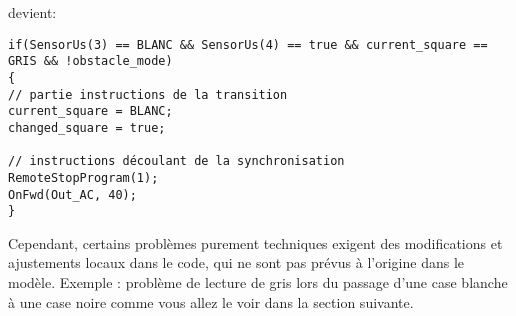devient:\newline

\begin{verbatim}
if(SensorUs(3) == BLANC && SensorUs(4) == true && current_square == GRIS && !obstacle_mode)
{
// partie instructions de la transition
current_square = BLANC;
changed_square = true;

// instructions découlant de la synchronisation
RemoteStopProgram(1);
OnFwd(Out_AC, 40);
}
\end{verbatim}


Cependant, certains problèmes purement techniques exigent des modifications et ajustements locaux dans le code, qui ne sont pas prévus à l'origine dans le modèle. Exemple : problème de lecture de gris lors du passage d'une case blanche à une case noire comme vous allez le voir dans la section suivante.
